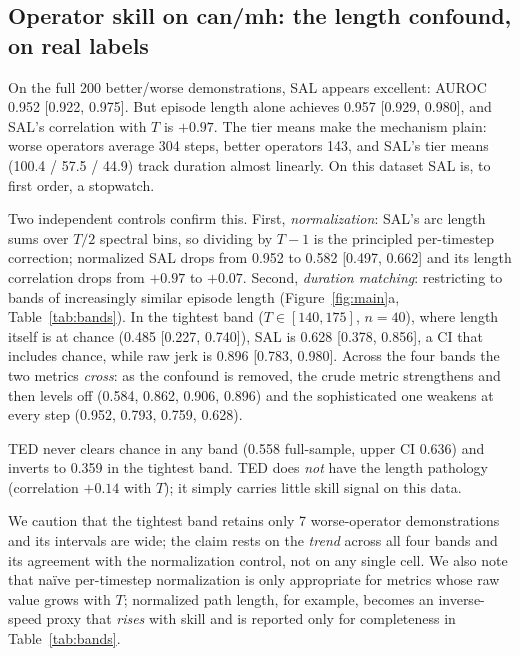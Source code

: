 \documentclass{article}
\begin{document}
\subsection{Operator skill on can/mh: the length confound, on real labels}

On the full 200 better/worse demonstrations, SAL appears excellent: AUROC
0.952 [0.922, 0.975]. But episode length alone achieves 0.957 [0.929,
0.980], and SAL's correlation with $T$ is $+0.97$. The tier means make the
mechanism plain: worse operators average 304 steps, better operators 143,
and SAL's tier means (100.4 / 57.5 / 44.9) track duration almost linearly.
On this dataset SAL is, to first order, a stopwatch.

Two independent controls confirm this. First, \emph{normalization}: SAL's
arc length sums over $T/2$ spectral bins, so dividing by $T{-}1$ is the
principled per-timestep correction; normalized SAL drops from 0.952 to 0.582
[0.497, 0.662] and its length correlation drops from $+0.97$ to $+0.07$.
Second, \emph{duration matching}: restricting to bands of increasingly
similar episode length (Figure~\ref{fig:main}a, Table~\ref{tab:bands}). In
the tightest band ($T \in [140,175]$, $n{=}40$), where length itself is at
chance (0.485 [0.227, 0.740]), SAL is 0.628 [0.378, 0.856], a CI that
includes chance, while raw jerk is 0.896 [0.783, 0.980]. Across the four
bands the two metrics \emph{cross}: as the confound is removed, the crude
metric strengthens and then levels off (0.584, 0.862, 0.906, 0.896) and the
sophisticated one weakens at every step (0.952, 0.793, 0.759, 0.628).

TED never clears chance in any band (0.558 full-sample, upper CI 0.636)
and inverts to 0.359 in the tightest band. TED does \emph{not}
have the length pathology (correlation $+0.14$ with $T$); it simply carries
little skill signal on this data.

We caution that the tightest band retains only 7 worse-operator
demonstrations and its intervals are wide; the claim rests on the
\emph{trend} across all four bands and its agreement with the normalization
control, not on any single cell. We also note that na\"ive per-timestep
normalization is only appropriate for metrics whose raw value grows with
$T$; normalized path length, for example, becomes an inverse-speed proxy
that \emph{rises} with skill and is reported only for completeness in
Table~\ref{tab:bands}.
\end{document}
